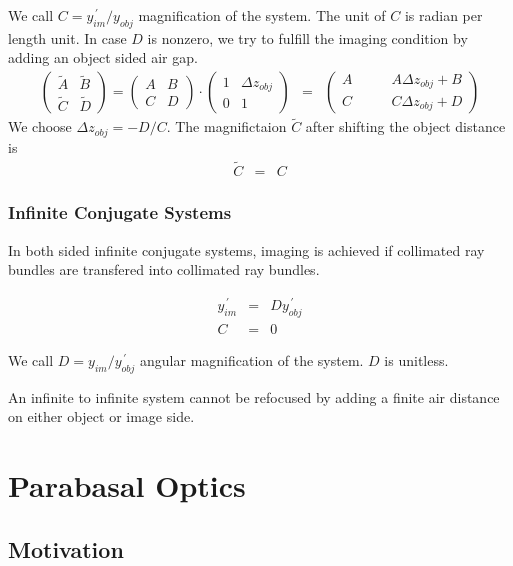 \documentclass[12pt,a4paper,twoside,openright,BCOR10mm,headsepline,titlepage,abstracton,chapterprefix,final]{scrreprt}
\begin{document}
We call $C = y^{\,\prime}_{im} / y_{obj}$ magnification of the system.
The unit of $C$ is radian per length unit.
In case $D$ is nonzero, we try to fulfill the imaging condition by adding an object sided air gap.
\begin{eqnarray}
 \begin{pmatrix}
  \tilde{A} & \tilde{B} \\ \tilde{C} & \tilde{D}
 \end{pmatrix}
 =
 \begin{pmatrix}
  A & B \\ C & D
 \end{pmatrix}
 \cdot
  \begin{pmatrix}
  1 & \Delta z_{obj} \\ 0 & 1
 \end{pmatrix}
 &=&
 \begin{pmatrix}
  A\qquad & A \Delta z_{obj} + B \\
  C\qquad & C \Delta z_{obj} + D 
 \end{pmatrix}
\end{eqnarray}
We choose $\Delta z_{obj} = - D / C$.
The magnifictaion $\tilde{C}$ after shifting the object distance is
\begin{eqnarray}
 \tilde{C} &=& C 
\end{eqnarray}


\subsubsection{Infinite Conjugate Systems}
In both sided infinite conjugate systems, imaging is achieved if collimated ray bundles are transfered into collimated ray bundles.

\begin{eqnarray}
   y^{\,\prime}_{im} &=& D y^{\,\prime}_{obj} \\
   C &=& 0
\end{eqnarray}

We call $D = y_{im} / y^{\,\prime}_{obj}$ angular magnification of the system.
$D$ is unitless.

An infinite to infinite system cannot be refocused by adding a finite air distance on either object or image side.

\section{Parabasal Optics}

\subsection{Motivation}
\end{document}
